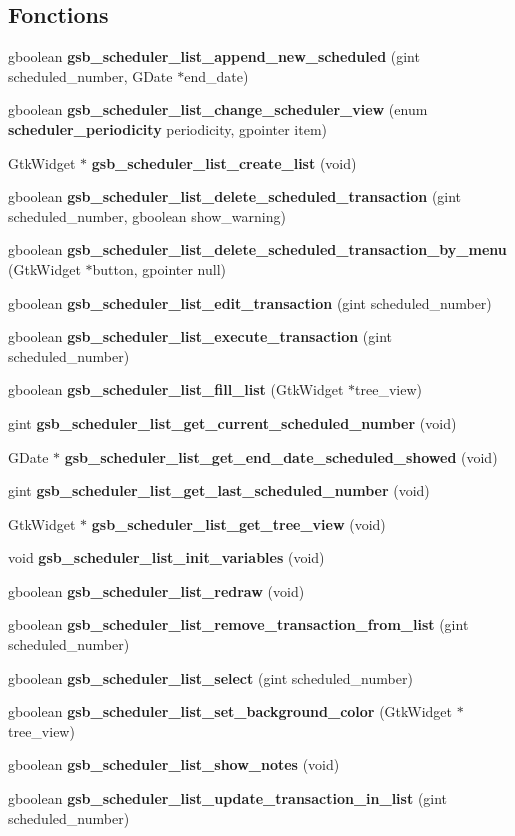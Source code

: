 \subsection*{Fonctions}
\begin{DoxyCompactItemize}
\item 
gboolean {\bf gsb\_\-scheduler\_\-list\_\-append\_\-new\_\-scheduled} (gint scheduled\_\-number, GDate $\ast$end\_\-date)
\item 
gboolean {\bf gsb\_\-scheduler\_\-list\_\-change\_\-scheduler\_\-view} (enum {\bf scheduler\_\-periodicity} periodicity, gpointer item)
\item 
GtkWidget $\ast$ {\bf gsb\_\-scheduler\_\-list\_\-create\_\-list} (void)
\item 
gboolean {\bf gsb\_\-scheduler\_\-list\_\-delete\_\-scheduled\_\-transaction} (gint scheduled\_\-number, gboolean show\_\-warning)
\item 
gboolean {\bf gsb\_\-scheduler\_\-list\_\-delete\_\-scheduled\_\-transaction\_\-by\_\-menu} (GtkWidget $\ast$button, gpointer null)
\item 
gboolean {\bf gsb\_\-scheduler\_\-list\_\-edit\_\-transaction} (gint scheduled\_\-number)
\item 
gboolean {\bf gsb\_\-scheduler\_\-list\_\-execute\_\-transaction} (gint scheduled\_\-number)
\item 
gboolean {\bf gsb\_\-scheduler\_\-list\_\-fill\_\-list} (GtkWidget $\ast$tree\_\-view)
\item 
gint {\bf gsb\_\-scheduler\_\-list\_\-get\_\-current\_\-scheduled\_\-number} (void)
\item 
GDate $\ast$ {\bf gsb\_\-scheduler\_\-list\_\-get\_\-end\_\-date\_\-scheduled\_\-showed} (void)
\item 
gint {\bf gsb\_\-scheduler\_\-list\_\-get\_\-last\_\-scheduled\_\-number} (void)
\item 
GtkWidget $\ast$ {\bf gsb\_\-scheduler\_\-list\_\-get\_\-tree\_\-view} (void)
\item 
void {\bf gsb\_\-scheduler\_\-list\_\-init\_\-variables} (void)
\item 
gboolean {\bf gsb\_\-scheduler\_\-list\_\-redraw} (void)
\item 
gboolean {\bf gsb\_\-scheduler\_\-list\_\-remove\_\-transaction\_\-from\_\-list} (gint scheduled\_\-number)
\item 
gboolean {\bf gsb\_\-scheduler\_\-list\_\-select} (gint scheduled\_\-number)
\item 
gboolean {\bf gsb\_\-scheduler\_\-list\_\-set\_\-background\_\-color} (GtkWidget $\ast$tree\_\-view)
\item 
gboolean {\bf gsb\_\-scheduler\_\-list\_\-show\_\-notes} (void)
\item 
gboolean {\bf gsb\_\-scheduler\_\-list\_\-update\_\-transaction\_\-in\_\-list} (gint scheduled\_\-number)
\end{DoxyCompactItemize}


